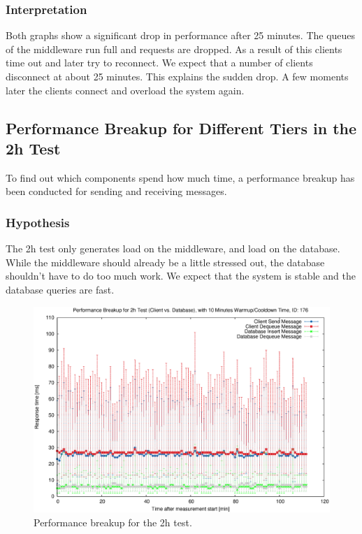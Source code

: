 \documentclass[milestone1.tex]{subfiles}
\begin{document}
\subsubsection{Interpretation}
Both graphs show a significant drop in performance after 25 minutes. The queues of the middleware run full and requests are dropped. As a result of this clients time out and later try to reconnect. We expect that a number of clients disconnect at about 25 minutes. This explains the sudden drop. A few moments later the clients connect and overload the system again.


\subsection{Performance Breakup for Different Tiers in the 2h Test}

To find out which components spend how much time, a performance breakup has been conducted for sending and receiving messages.

\subsubsection{Hypothesis}
The 2h test only generates load on the middleware, and load on the database. While the middleware should already be a little stressed out, the database shouldn't have to do too much work. We expect that the system is stable and the database queries are fast.

\begin{figure}[H]
        \begin{center}
    \includegraphics[scale=0.55]{../exported_plots/2h/performance_breakup.eps}
  \end{center}
  \caption{Performance breakup for the 2h test.}
  \label{fig:performancebreakup2h}
\end{figure}
\end{document}
